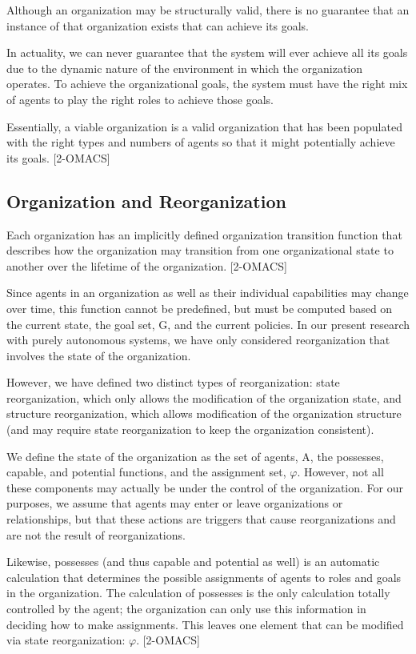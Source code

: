 Although an organization may be structurally valid, there is no guarantee that an instance of that organization exists that can achieve its goals. 

In actuality, we can never guarantee that the system will ever achieve all its goals due to the dynamic nature of the environment in which the organization operates. To achieve the organizational goals, the system must have the right mix of agents to play the right roles to achieve those goals. 

Essentially, a viable organization is a valid organization that has been populated with the right types and numbers of agents so that it might potentially achieve its goals. [2-OMACS]

\subsection{ Organization and Reorganization }
Each organization has an implicitly defined organization transition function 
that describes how the organization may transition from one organizational state 
to another over the lifetime of the organization.  [2-OMACS]
	
Since agents in an organization as well as their individual capabilities may change over time, 
this function cannot be predefined, but must be computed based on the current state, 
the goal set, G, and the current policies. In our present research with purely autonomous systems, we have only considered reorganization that involves the state of the organization. 

However, we have defined two distinct types of reorganization: state reorganization, which only allows the modification of the organization state, and structure reorganization, which allows modification  of the organization structure (and may require state reorganization to keep the organization consistent).

We define the state of the organization as the set of agents, A, the possesses, capable, and potential functions, and the assignment set, $\varphi$. However, not all these components may actually be under the control of the organization. For our purposes, we assume that agents may enter or leave organizations or relationships, but that these actions are triggers that cause reorganizations and are not the result of reorganizations. 

Likewise, possesses (and thus capable and potential as well) is an automatic calculation that determines the possible assignments of agents to roles and goals in the organization. The calculation of possesses is the only calculation totally controlled by the agent; the organization can only use this information in deciding how to make assignments. This leaves one element that can be modified via state reorganization: $\varphi$.
	[2-OMACS]
